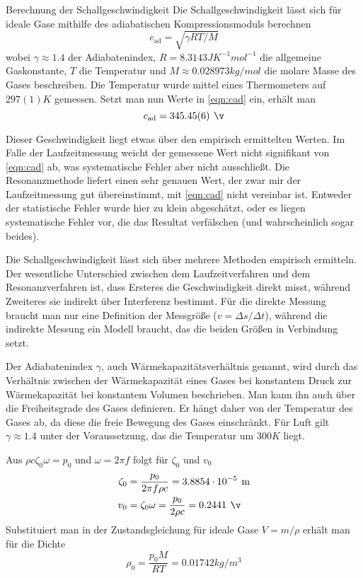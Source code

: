 \documentclass{alex_gp}
\begin{document}
\begin{mybox}{Berechnung der Schallgeschwindigkeit}
	Die Schallgeschwindigkeit lässt sich für ideale Gase mithilfe des adiabatischen Kompressionsmoduls berechnen 
	\begin{equation}\label{eqn:cad}
		c_{\text{ad}} = \sqrt{\gamma RT/M}
	\end{equation}
	wobei \( \gamma \approx 1.4 \) der Adiabatenindex, \( R = 8.3143 \unit{J K^{-1} mol^{-1}} \) die allgemeine Gaskonstante, \( T \) die Temperatur und \( M \approx 0.028973 \unit{kg/mol} \) die molare Masse des Gases beschreiben.
	Die Temperatur wurde mittel eines Thermometers auf \( 297(1) \unit{K} \) gemessen. 
	Setzt man nun Werte in \autoref{eqn:cad} ein, erhält man 
	\begin{equation}\label{eqn:cad2}
		c_{\text{ad}} = 345.45(6) \unit{\v}
	\end{equation}
	
	Dieser Geschwindigkeit liegt etwas über den empirisch ermittelten Werten. Im Falle der Laufzeitmessung weicht der gemessene Wert nicht signifikant von \autoref{eqn:cad} ab, was systematische Fehler aber nicht ausschließt. Die Resonanzmethode liefert einen sehr genauen Wert, der zwar mir der Laufzeitmessung gut übereinstimmt, mit \autoref{eqn:cad} nicht vereinbar ist. Entweder der statistische Fehler wurde hier zu klein abgeschätzt, oder es liegen systematische Fehler vor, die das Resultat verfälschen (und wahrscheinlich sogar beides). 
	
	Die Schallgeschwindigkeit lässt sich über mehrere Methoden empirisch ermitteln. Der wesentliche Unterschied zwischen dem Laufzeitverfahren und dem Resonanzverfahren ist, dass Ersteres die Geschwindigkeit direkt misst, während Zweiteres sie indirekt über Interferenz bestimmt. Für die direkte Messung braucht man nur eine Definition der Messgröße (\( v = \Delta s/ \Delta t \)), während die indirekte Messung ein Modell braucht, das die beiden Größen in Verbindung setzt.
	
	Der Adiabatenindex \( \gamma \), auch Wärmekapazitätsverhältnis genannt, wird durch das Verhältnis zwischen der Wärmekapazität eines Gases bei konstantem Druck zur Wärmekapazität bei konstantem Volumen beschrieben. Man kann ihn auch über die Freiheitsgrade des Gases definieren. Er hängt daher von der Temperatur des Gases ab, da diese die freie Bewegung des Gases einschränkt.
	Für Luft gilt \( \gamma \approx 1.4 \) unter der Voraussetzung, das die Temperatur um \( 300 \unit{K} \) liegt.
	
	Aus \( 	\rho c \zeta_0 \omega = p_0 \) und \( \omega = 2\pi f \) folgt für \( \zeta_0 \) und \( v_0 \)
	\begin{align}\label{eqn:zeta}
		\zeta_0 &= \frac{p_0}{2\pi f\rho c} = 3.8854 \cdot 10^{-5} \unit{m} \\
		v_0 &= \zeta_0\omega = \frac{p_0}{2\rho c} = 0.2441 \unit{\v}
	\end{align}
	Substituiert man in der Zustandsgleichung für ideale Gase \( V = m/\rho \) erhält man für die Dichte
	\begin{equation}\label{eqn:density}
		\rho_0 = \frac{p_0M}{RT} = 0.01742 \unit{kg/m^3}
	\end{equation}
\end{mybox}
\end{document}
